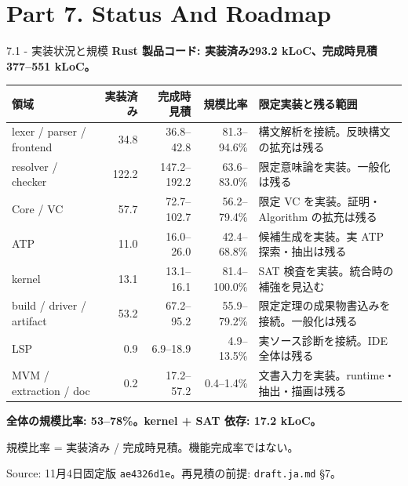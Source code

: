 \documentclass[dvipdfmx,aspectratio=169,11pt]{beamer}
\begin{document}
\section{Part 7. Status And Roadmap}
\begin{frame}[fragile,t]{7.1 - 実装状況と規模}
\textcolor{blue!55!black}{\textbf{Rust 製品コード: 実装済み293.2 kLoC、完成時見積377–551 kLoC。}}

\par{}
\begin{scriptsize}
\setlength{\tabcolsep}{3pt}
\renewcommand{\arraystretch}{1.15}
\begin{tabularx}{\textwidth}{lrrr>{\raggedright\arraybackslash}X}
\toprule
\textbf{領域} & \textbf{実装済み} & \textbf{完成時見積} & \textbf{規模比率} & \textbf{限定実装と残る範囲} \\
\midrule
lexer / parser / frontend & 34.8 & 36.8–42.8 & 81.3–94.6\% & 構文解析を接続。反映構文の拡充は残る \\
resolver / checker & 122.2 & 147.2–192.2 & 63.6–83.0\% & 限定意味論を実装。一般化は残る \\
Core / VC & 57.7 & 72.7–102.7 & 56.2–79.4\% & 限定 VC を実装。証明・Algorithm の拡充は残る \\
ATP & 11.0 & 16.0–26.0 & 42.4–68.8\% & 候補生成を実装。実 ATP 探索・抽出は残る \\
kernel & 13.1 & 13.1–16.1 & 81.4–100.0\% & SAT 検査を実装。統合時の補強を見込む \\
build / driver / artifact & 53.2 & 67.2–95.2 & 55.9–79.2\% & 限定定理の成果物書込みを接続。一般化は残る \\
LSP & 0.9 & 6.9–18.9 & 4.9–13.5\% & 実ソース診断を接続。IDE 全体は残る \\
MVM / extraction / doc & 0.2 & 17.2–57.2 & 0.4–1.4\% & 文書入力を実装。runtime・抽出・描画は残る \\
\bottomrule
\end{tabularx}
\end{scriptsize}

\textcolor{blue!55!black}{\textbf{全体の規模比率: 53–78\%。kernel + SAT 依存: 17.2 kLoC。}}

{\footnotesize 規模比率 = 実装済み / 完成時見積。機能完成率ではない。}

{\footnotesize Source: 11月4日固定版 \texttt{ae4326d1e}。再見積の前提: \texttt{draft.ja.md} §7。}


\end{frame}
\end{document}
